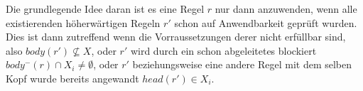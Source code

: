 Die grundlegende Idee daran ist es eine Regel $r$ nur dann anzuwenden, wenn alle
existierenden höherwärtigen Regeln $r'$ schon auf Anwendbarkeit geprüft wurden.
Dies ist dann zutreffend wenn die Vorraussetzungen derer nicht erfüllbar sind, also
$body(r') \not\subseteq X$, oder $r'$ wird durch ein schon abgeleitetes blockiert
$body^-(r) \cap X_i \neq \emptyset$, oder $r'$ beziehungsweise eine andere Regel mit
dem selben Kopf wurde bereits angewandt $head(r') \in X_i$.
